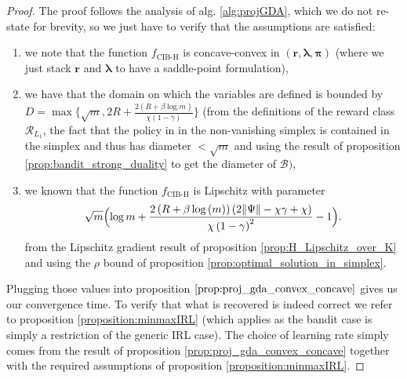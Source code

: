  \begin{proof}
    The proof follows the analysis of alg. \ref{alg:projGDA}, which we do not re-state for brevity, so we just have to verify that the assumptions are satisfied:
    \begin{enumerate}
        \item we note that the function $f_\text{CIB-H}$ is concave-convex in $(\bm{r},\bm{\lambda},\bm{\pi})$ (where we just stack $\bm{r}$ and $\bm{\lambda}$ to have a saddle-point formulation),
        \item we have that the domain on which the variables are defined is bounded by $D= \max\Big\{\sqrt{m},2R +\frac{2(R +\beta \log m)}{\chi (1-\gamma)} \Big\} $ (from the definitions of the reward class $\mathcal{R}_{L_1}$, the fact that the policy in in the non-vanishing simplex is contained in the simplex and thus has diameter $<\sqrt{m}$ and using the result of proposition \ref{prop:bandit_strong_duality} to get the diameter of $\mathcal{B})$,
        \item we known that the function $f_\text{CIB-H}$ is Lipschitz with parameter \[
            \sqrt{m} 
            \Bigl( \log m +
            \frac{2\left(R + \beta \log{\left(m \right)}\right) \left(2  \|\Psi\| - \chi \gamma + \chi\right)}{\chi \left(1- \gamma\right)^{2}} 
            -1
            \Bigr).    
        \] from the Lipschitz gradient result of proposition \ref{prop:H_Lipschitz_over_K} and using the $\rho$ bound of proposition \ref{prop:optimal_solution_in_simplex}.
    \end{enumerate}
    Plugging those values into proposition $\ref{prop:proj_gda_convex_concave}$ gives us our convergence time. To verify that what is recovered is indeed correct we refer to proposition \ref{proposition:minmaxIRL} (which applies as the bandit case is simply a restriction of the generic IRL case). The choice of learning rate simply comes from the result of proposition \ref{prop:proj_gda_convex_concave} together with the required assumptions of proposition \ref{proposition:minmaxIRL}.
\end{proof}

